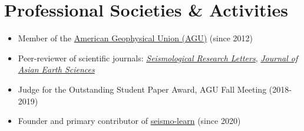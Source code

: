 \section{Professional Societies \& Activities}

\begin{itemize}
\item Member of the \href{https://sites.agu.org/}{American Geophysical Union (AGU)} (since 2012)
\item Peer-reviewer of scientific journals:
      \textit{\href{https://pubs.geoscienceworld.org/srl/}{Seismological Research Letters}},
      \textit{\href{https://www.journals.elsevier.com/journal-of-asian-earth-sciences/}{Journal of Asian Earth Sciences}}
\item Judge for the Outstanding Student Paper Award, AGU Fall Meeting (2018-2019)
\item Founder and primary contributor of \href{https://seismo-learn.org/}{seismo-learn} (since 2020)
\end{itemize}
